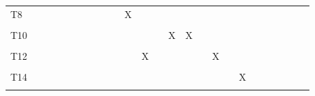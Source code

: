 \documentclass[
]{article}
\begin{document}
\begin{longtable}[l]{lllllllllllllllllllllllll}
T8 &  &  &  &  &  &  &  &  &  & X &  &  &  &  &  &  &  &  &  &  &  &  &  & \\
\cellcolor{gray!6}{T9} & \cellcolor{gray!6}{} & \cellcolor{gray!6}{} & \cellcolor{gray!6}{} & \cellcolor{gray!6}{} & \cellcolor{gray!6}{} & \cellcolor{gray!6}{} & \cellcolor{gray!6}{} & \cellcolor{gray!6}{} & \cellcolor{gray!6}{} & \cellcolor{gray!6}{} & \cellcolor{gray!6}{X} & \cellcolor{gray!6}{X} & \cellcolor{gray!6}{} & \cellcolor{gray!6}{} & \cellcolor{gray!6}{} & \cellcolor{gray!6}{} & \cellcolor{gray!6}{} & \cellcolor{gray!6}{} & \cellcolor{gray!6}{} & \cellcolor{gray!6}{} & \cellcolor{gray!6}{} & \cellcolor{gray!6}{} & \cellcolor{gray!6}{} & \cellcolor{gray!6}{}\\
T10 &  &  &  &  &  &  &  &  &  &  &  &  & X & X &  &  &  &  &  &  &  &  &  & \\
\addlinespace
\cellcolor{gray!6}{T11} & \cellcolor{gray!6}{} & \cellcolor{gray!6}{} & \cellcolor{gray!6}{} & \cellcolor{gray!6}{} & \cellcolor{gray!6}{} & \cellcolor{gray!6}{} & \cellcolor{gray!6}{} & \cellcolor{gray!6}{} & \cellcolor{gray!6}{} & \cellcolor{gray!6}{} & \cellcolor{gray!6}{} & \cellcolor{gray!6}{} & \cellcolor{gray!6}{} & \cellcolor{gray!6}{} & \cellcolor{gray!6}{X} & \cellcolor{gray!6}{} & \cellcolor{gray!6}{} & \cellcolor{gray!6}{} & \cellcolor{gray!6}{} & \cellcolor{gray!6}{} & \cellcolor{gray!6}{} & \cellcolor{gray!6}{} & \cellcolor{gray!6}{} & \cellcolor{gray!6}{}\\
T12 &  &  &  &  &  &  &  &  &  &  & X &  &  &  &  & X &  &  &  &  &  &  &  & \\
\cellcolor{gray!6}{T13} & \cellcolor{gray!6}{} & \cellcolor{gray!6}{} & \cellcolor{gray!6}{} & \cellcolor{gray!6}{} & \cellcolor{gray!6}{} & \cellcolor{gray!6}{} & \cellcolor{gray!6}{} & \cellcolor{gray!6}{} & \cellcolor{gray!6}{} & \cellcolor{gray!6}{} & \cellcolor{gray!6}{} & \cellcolor{gray!6}{} & \cellcolor{gray!6}{} & \cellcolor{gray!6}{} & \cellcolor{gray!6}{} & \cellcolor{gray!6}{} & \cellcolor{gray!6}{X} & \cellcolor{gray!6}{} & \cellcolor{gray!6}{} & \cellcolor{gray!6}{} & \cellcolor{gray!6}{} & \cellcolor{gray!6}{} & \cellcolor{gray!6}{} & \cellcolor{gray!6}{}\\
T14 &  &  &  &  &  &  &  &  &  &  &  &  &  &  &  &  &  & X &  &  &  &  &  & \\
\cellcolor{gray!6}{T15} & \cellcolor{gray!6}{} & \cellcolor{gray!6}{} & \cellcolor{gray!6}{} & \cellcolor{gray!6}{} & \cellcolor{gray!6}{} & \cellcolor{gray!6}{} & \cellcolor{gray!6}{} & \cellcolor{gray!6}{} & \cellcolor{gray!6}{} & \cellcolor{gray!6}{} & \cellcolor{gray!6}{} & \cellcolor{gray!6}{} & \cellcolor{gray!6}{} & \cellcolor{gray!6}{} & \cellcolor{gray!6}{} & \cellcolor{gray!6}{} & \cellcolor{gray!6}{} & \cellcolor{gray!6}{} & \cellcolor{gray!6}{X} & \cellcolor{gray!6}{} & \cellcolor{gray!6}{} & \cellcolor{gray!6}{} & \cellcolor{gray!6}{} & \cellcolor{gray!6}{}\\

\end{longtable}
\end{document}
